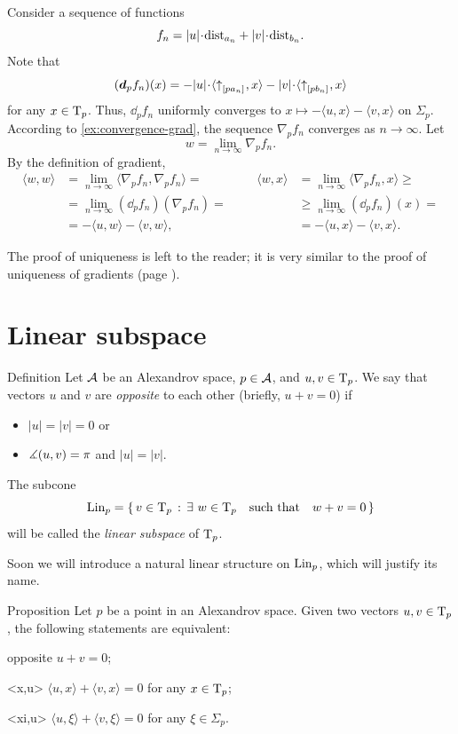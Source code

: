 Consider a sequence of functions 
\[f_n=|u|\cdot\distfun_{a_n}+|v|\cdot\distfun_{b_n}.\]
Note that 
\[(\dd_pf_n)(x)=-|u|\cdot\langle \dir{p}{a_n},x\rangle -|v|\cdot\langle \dir{p}{b_n},x\rangle\]
for any $x\in\mathrm{T}_p$.
Thus, $\dd_pf_n$ uniformly converges to $x\mapsto-\langle u,x\rangle -\langle v,x\rangle$ on $\Sigma_p$.
According to \ref{ex:convergence-grad}, 
the sequence $\nabla_pf_n$ converges as $n\to\infty$.
Let 
\[w=\lim_{n\to\infty}\nabla_pf_n.\]
By the definition of gradient,
\begin{align*}
\langle w,w\rangle &=\lim_{n\to\infty}\langle \nabla_pf_n,\nabla_pf_n\rangle =
&&&%
\langle w,x\rangle &=\lim_{n\to\infty}\langle \nabla_pf_n,x\rangle \ge
\\%
&=\lim_{n\to\infty}(\dd_p f_n)(\nabla_p f_n)
=
&&&%
&\ge
\lim_{n\to\infty}(\dd_pf_n)(x)
=
\\%
&=-\langle u,w\rangle -\langle v,w\rangle ,
&&&%
&=-\langle u,x\rangle -\langle v,x\rangle .
\end{align*}

The proof of uniqueness is left to the reader;
it is very similar to the proof of uniqueness of gradients (page \pageref{uniqueness:prop:grad-exist}).
\qeds

\section{Linear subspace}

\begin{thm}{Definition}\label{def:opp+Lin}
Let $\mathcal{A}$ be an Alexandrov space, $p\in \mathcal{A}$, and $u,v\z\in\T_p$.
We say that vectors $u$ and $v$ are \emph{opposite}\label{def:opposite:page} to each other (briefly, $u+v=0$) if
\begin{itemize}
 \item $|u|=|v|=0$ or
 \item $\measuredangle(u,v)=\pi$ and $|u|=|v|$.
\end{itemize}

The subcone
\[\Lin_p=\set{v\in\T_p}{\exists\ w\in\T_p\quad \text{such that}\quad w+v=0}\]
will be called the \emph{linear subspace} of $\mathrm{T}_p$.
\end{thm}

Soon we will introduce a natural linear structure on $\mathop{\rm Lin}\nolimits_p$, which will justify its name.

\begin{thm}{Proposition}\label{prop:opposite}
Let $p$ be a point in an Alexandrov space.
Given two vectors $u,v\in\mathrm{T}_p$, the following statements are equivalent:
\begin{subthm}{opposite} $u+v=0$;
\end{subthm}
\begin{subthm}{<x,u>} $\langle u,x\rangle +\langle v,x\rangle =0$ for any $x\in\mathrm{T}_p$;
\end{subthm}
\begin{subthm}{<xi,u>} $\langle u,\xi\rangle +\langle v,\xi\rangle =0$ for any $\xi\in\Sigma_p$.
\end{subthm}
\end{thm}


